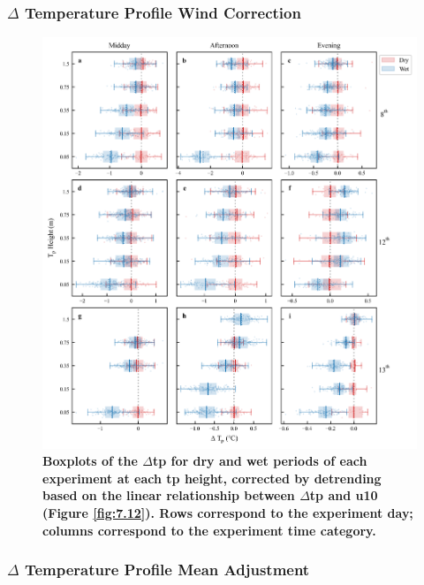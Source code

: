 \documentclass[final,3p,times,authoryear]{elsarticle}
\begin{document}
\subsubsection{$\Delta$ Temperature Profile Wind Correction}\label{sec:appendix7.5.5}

\begin{figure}
\centering
\includegraphics[trim={0 0 0 0},clip,scale=1.0]{pict042.png}
\caption{\bf Boxplots of the $\Delta$\gls{tp} for dry and wet periods of each experiment at each \gls{tp} height, corrected by detrending based on the linear relationship between $\Delta$\gls{tp} and \gls{u10} (Figure \ref{fig:7.12}). Rows correspond to the experiment day; columns correspond to the experiment time category.}
 \label{fig:7.13}
\end{figure}
\clearpage


\subsubsection{$\Delta$ Temperature Profile Mean Adjustment}\label{sec:appendix7.5.6}
\end{document}
